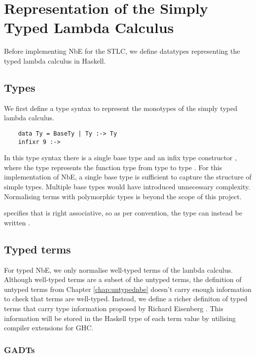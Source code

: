 \chapter{Representation of the Simply Typed Lambda Calculus}
\label{chap:typedlamadacalculus}

Before implementing NbE for the STLC, we define datatypes representing the typed lambda calculus in Haskell. 

\section{Types}

We first define a type syntax to represent the monotypes of the simply typed lambda calculus. 

\begin{lstlisting}
    data Ty = BaseTy | Ty :-> Ty 
    infixr 9 :->
\end{lstlisting}

In this type syntax there is a single base type  and an infix type constructor \code{:->}, where the type  represents the function type from type  to type . For this implementation of NbE, a single base type is sufficient to capture the structure of simple types. Multiple base types would have introduced unnecessary complexity.
Normalising terms with polymorphic types is beyond the scope of this project.
 
 specifies that \code{:->} is right associative, so as per convention, the type  can instead be written .

\section{Typed terms}

For typed NbE, we only normalise well-typed terms of the lambda calculus. Although well-typed terms are a subset of the untyped terms, the definition of untyped terms from Chapter \ref{chap:untypednbe} doesn't carry enough information to check that terms are well-typed. Instead, we define a richer definiton of typed terms that carry type information proposed by Richard Eisenberg \cite{GADTs}. This information will be stored in the Haskell type of each term value by utilising compiler extensions for GHC. 

\subsection{GADTs}

